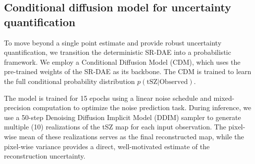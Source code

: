 \documentclass[]{article}
\begin{document}
\subsection{Conditional diffusion model for uncertainty quantification}
To move beyond a single point estimate and provide robust uncertainty quantification, we transition the deterministic SR-DAE into a probabilistic framework. We employ a Conditional Diffusion Model (CDM), which uses the pre-trained weights of the SR-DAE as its backbone. The CDM is trained to learn the full conditional probability distribution $p(\text{tSZ} | \text{Observed})$.

The model is trained for 15 epochs using a linear noise schedule and mixed-precision computation to optimize the noise prediction task. During inference, we use a 50-step Denoising Diffusion Implicit Model (DDIM) sampler to generate multiple (10) realizations of the tSZ map for each input observation. The pixel-wise mean of these realizations serves as the final reconstructed map, while the pixel-wise variance provides a direct, well-motivated estimate of the reconstruction uncertainty.
\end{document}
